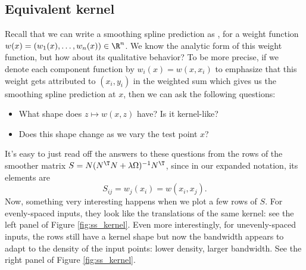 \documentclass{article}
\begin{document}
\subsection{Equivalent kernel}

Recall that we can write a smoothing spline prediction as , for a weight function  $w(x) = (w_1(x), \dots, w_n(x)) \in \R^n$.
We know the analytic form of this weight function, but how about its qualitative
behavior? To be more precise, if we denote each component function by $w_i(x) =
w(x, x_i)$ to emphasize that this weight gets attributed to $(x_i, y_i)$ in the
weighted sum  which gives us the
smoothing spline prediction at $x$, then we can ask the following questions:         
\begin{itemize}
\item What shape does $z \mapsto w(x, z)$ have? Is it kernel-like?
\item Does this shape change as we vary the test point $x$? 
\end{itemize}

It's easy to just read off the answers to these questions from the rows of the
smoother matrix $S = N(N^\T N + \lambda \Omega)^{-1} N^\T$, since in our
expanded notation, its elements are
\[
S_{ij} = w_j(x_i) = w(x_i, x_j).
\]
Now, something very interesting happens when we plot a few rows of $S$. For
evenly-spaced inputs, they look like the translations of the same kernel: see
the left panel of Figure \ref{fig:ss_kernel}. Even more interestingly, for
unevenly-spaced inputs, the rows still have a kernel shape but now the bandwidth
appears to adapt to the density of the input points: lower density, larger
bandwidth. See the right panel of Figure \ref{fig:ss_kernel}.
\end{document}
